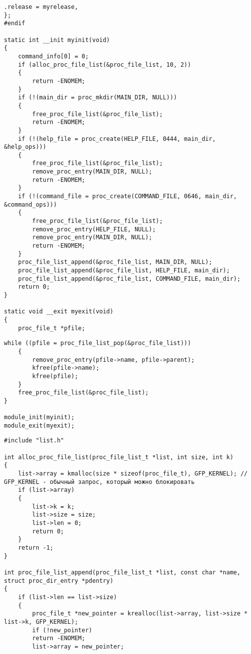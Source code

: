 \begin{center}
\begin{lstlisting}[label=listing_main_c9,caption=Файл main.c]
	.release = myrelease,
};
#endif

static int __init myinit(void)
{   
	command_info[0] = 0;
	if (alloc_proc_file_list(&proc_file_list, 10, 2))
	{
		return -ENOMEM;
	}
	if (!(main_dir = proc_mkdir(MAIN_DIR, NULL)))
	{
		free_proc_file_list(&proc_file_list);
		return -ENOMEM;
	}
	if (!(help_file = proc_create(HELP_FILE, 0444, main_dir, &help_ops)))
	{
		free_proc_file_list(&proc_file_list);
		remove_proc_entry(MAIN_DIR, NULL);
		return -ENOMEM;
	}
	if (!(command_file = proc_create(COMMAND_FILE, 0646, main_dir, &command_ops)))
	{
		free_proc_file_list(&proc_file_list);
		remove_proc_entry(HELP_FILE, NULL);
		remove_proc_entry(MAIN_DIR, NULL);
		return -ENOMEM;
	}
	proc_file_list_append(&proc_file_list, MAIN_DIR, NULL);
	proc_file_list_append(&proc_file_list, HELP_FILE, main_dir);
	proc_file_list_append(&proc_file_list, COMMAND_FILE, main_dir);
	return 0;
}

static void __exit myexit(void)
{
	proc_file_t *pfile;
	\end{lstlisting}
\end{center}

\begin{center}
\begin{lstlisting}[label=listing_main_c10,caption=Файл main.c]
	while ((pfile = proc_file_list_pop(&proc_file_list)))
	{ 
		remove_proc_entry(pfile->name, pfile->parent);
		kfree(pfile->name);
		kfree(pfile);
	}
	free_proc_file_list(&proc_file_list);
}

module_init(myinit);
module_exit(myexit);
	\end{lstlisting}
\end{center}

\begin{center}
	\begin{lstlisting}[label=listing_list_c1,caption=Файл list.c]
#include "list.h"

int alloc_proc_file_list(proc_file_list_t *list, int size, int k)
{
	list->array = kmalloc(size * sizeof(proc_file_t), GFP_KERNEL); // GFP_KERNEL - обычный запрос, который можно блокировать
	if (list->array)
	{
		list->k = k;
		list->size = size;
		list->len = 0;
		return 0;
	}
	return -1;
}

int proc_file_list_append(proc_file_list_t *list, const char *name, struct proc_dir_entry *pdentry)
{
	if (list->len == list->size)
	{
		proc_file_t *new_pointer = krealloc(list->array, list->size * list->k, GFP_KERNEL);
		if (!new_pointer)
		return -ENOMEM;
		list->array = new_pointer;
	\end{lstlisting}
\end{center}

